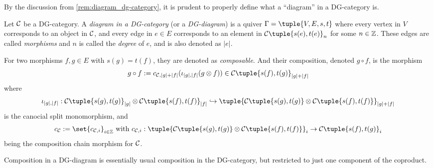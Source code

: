 \begin{notation}
    By the discussion from \autoref{rem:diagram_dg-category}, it is prudent to properly define what a ``diagram'' in a DG-category is.

    Let \( {\mathcal{C}} \) be a DG-category. A \emph{diagram in a DG-category} (or a \emph{DG-diagram}) is a quiver \( \Gamma = \tuple{V, E, s, t} \) where every vertex in \( V \) corresponds to an object in \( {\mathcal{C}} \), and every edge in \( e \in E \) corresponds to an element in \( \Cc\tuple{s(e), t(e)}_n \) for some \( n \in {\mathbb{Z}} \). These edges are called \emph{morphisms} and \( n \) is called the \emph{degree} of \( e \), and is also denoted as \( |e| \).

    For two morphisms \( f, g \in E \) with \( s(g) = t(f) \), they are denoted as \emph{composable}. And their composition, denoted \( g \circ f \), is the morphism
    \[
        g \circ f := c_{\Cc, |g| + |f|}(\iota_{|g|, |f|}(g \otimes f)) \in \Cc\tuple{s(f), t(g)}_{|g| + |f|}
    \]
    where
    \[
        \iota_{|g|, |f|}: \Cc\tuple{s(g), t(g)}_{|g|} \otimes \Cc\tuple{s(f), t(f)}_{|f|} \hookrightarrow \tuple{ \Cc\tuple{s(g), t(g)} \otimes \Cc\tuple{s(f), t(f)} }_{|g| + |f|}
    \]
    is the canocial split monomorphism, and
    \[
        c_{\Cc} := \set{c_{\Cc, i}}_{i \in \Zb} \text{ with } c_{\Cc, i}: \tuple{ \Cc\tuple{s(g), t(g)} \otimes \Cc\tuple{s(f), t(f)} }_i \to \Cc\tuple{s(f), t(g)}_i
    \]
    being the composition chain morphism for \( {\mathcal{C}} \).
\end{notation}

\begin{remark}
    Composition in a DG-diagram is essentially usual composition in the DG-category, but restricted to just one component of the coproduct.
\end{remark}

